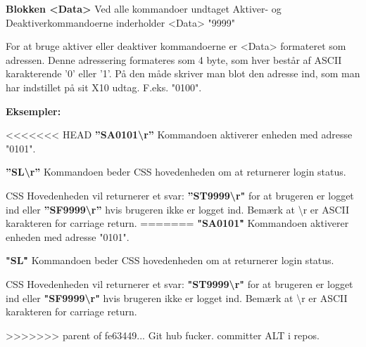 \textbf{Blokken <Data>}
Ved alle kommandoer undtaget Aktiver- og Deaktiverkommandoerne inderholder <Data> "9999"

For at bruge aktiver eller deaktiver kommandoerne er <Data> formateret som adressen. Denne adressering formateres som 4 byte, som hver består af ASCII karakterende '0' eller '1'. På den måde skriver man blot den adresse ind, som man har indstillet på sit X10 udtag. F.eks. "0100".

\textbf{Eksempler:}

<<<<<<< HEAD
\textbf{''SA0101\textbackslash r''}
Kommandoen aktiverer enheden med adresse "0101".

\textbf{''SL\textbackslash r''}
Kommandoen beder CSS hovedenheden om at returnerer login status.

CSS Hovedenheden vil returnerer et svar:
\textbf{''ST9999\textbackslash r"} for at brugeren er logget ind eller \textbf{''SF9999\textbackslash r''} hvis brugeren ikke er logget ind. Bemærk at \textbackslash r er ASCII karakteren for carriage return.
=======
\textbf{"SA0101\r"}
Kommandoen aktiverer enheden med adresse "0101".

\textbf{"SL\r"}
Kommandoen beder CSS hovedenheden om at returnerer login status.

CSS Hovedenheden vil returnerer et svar:
\textbf{"ST9999\textbackslash r"} for at brugeren er logget ind eller \textbf{"SF9999\textbackslash r"} hvis brugeren ikke er logget ind. Bemærk at \textbackslash r er ASCII karakteren for carriage return.

>>>>>>> parent of fe63449... Git hub fucker. committer ALT i repos.
